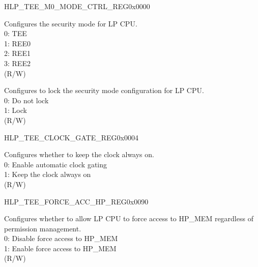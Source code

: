 \begin{register}{H}{LP\_TEE\_M0\_MODE\_CTRL\_REG}{0x0000}\label{regdesc:LPTEEM0MODECTRLREG}
%
%
%
\regnewline%
\begin{regdesc}\begin{reglist}
\label{fielddesc:LPTEEM0MODE}\item [LP\_TEE\_M0\_MODE] Configures the security mode for LP CPU.\\ 
0: TEE \\
1: REE0 \\
2: REE1 \\
3: REE2  \\
(R/W)
\label{fielddesc:LPTEEM0LOCK}\item [LP\_TEE\_M0\_LOCK] Configures to lock the security mode configuration for LP CPU. \\
0: Do not lock \\ 
1: Lock  \\
(R/W)
\end{reglist}\end{regdesc}
\end{register}


\begin{register}{H}{LP\_TEE\_CLOCK\_GATE\_REG}{0x0004}\label{regdesc:LPTEECLOCKGATEREG}
%
%
\regnewline%
\begin{regdesc}\begin{reglist}
\label{fielddesc:LPTEECLKEN}\item [LP\_TEE\_CLK\_EN] Configures whether to keep the clock always on.\\ 
0: Enable automatic clock gating \\ 
1: Keep the clock always on  \\ (R/W)
\end{reglist}\end{regdesc}
\end{register}


\begin{register}{H}{LP\_TEE\_FORCE\_ACC\_HP\_REG}{0x0090}\label{regdesc:LPTEEFORCEACCHPREG}
%
%
\regnewline%
\begin{regdesc}\begin{reglist}
\label{fielddesc:LPTEEFORCEACCHPMEMEN}\item [LP\_TEE\_FORCE\_ACC\_HPMEM\_EN] Configures whether to allow LP CPU to force access to HP\_MEM regardless of permission management.\\
0: Disable force access to HP\_MEM \\
1: Enable force access to HP\_MEM \\ (R/W)
\end{reglist}\end{regdesc}
\end{register}


